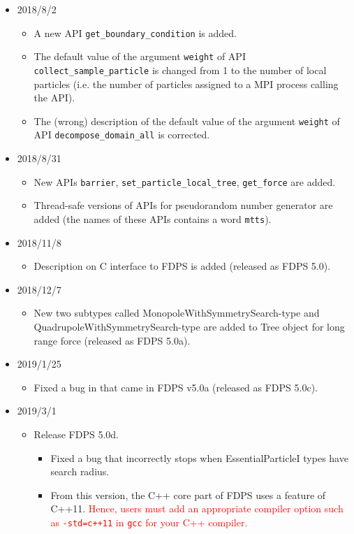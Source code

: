 \begin{itemize}[leftmargin=*,itemsep=-1ex]
\item 2018/8/2
\begin{itemize}
\item A new API \texttt{get\_boundary\_condition} is added.
\item The default value of the argument \texttt{weight} of API \texttt{collect\_sample\_particle} is changed from 1 to the number of local particles (i.e. the number of particles assigned to a MPI process calling the API).
\item The (wrong) description of the default value of the argument \texttt{weight} of API \texttt{decompose\_domain\_all} is corrected.
\end{itemize}

\item 2018/8/31
\begin{itemize}
\item New APIs \texttt{barrier}, \texttt{set\_particle\_local\_tree}, \texttt{get\_force} are added.
\item Thread-safe versions of APIs for pseudorandom number generator are added (the names of these APIs contains a word \texttt{mtts}).
\end{itemize}

\item 2018/11/8
\begin{itemize}
\item Description on C interface to FDPS is added (released as FDPS 5.0).
\end{itemize}

\item 2018/12/7
\begin{itemize}
\item New two subtypes called MonopoleWithSymmetrySearch-type and \newline QuadrupoleWithSymmetrySearch-type are added to Tree object for long range force (released as FDPS 5.0a).
\end{itemize}

\item 2019/1/25
\begin{itemize}
\item Fixed a bug in  that came in FDPS v5.0a (released as FDPS 5.0c).
\end{itemize}

\item 2019/3/1
\begin{itemize}
\item Release FDPS 5.0d.
\begin{itemize}
\item Fixed a bug that  incorrectly stops when EssentialParticleI types have search radius.
\item From this version, the C++ core part of FDPS uses a feature of C++11. \textcolor{red}{Hence, users must add an appropriate compiler option such as \texttt{-std=c++11} in \texttt{gcc} for your C++ compiler.}
\end{itemize}
\end{itemize}


\end{itemize}
